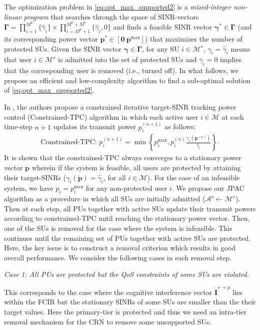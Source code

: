 \documentclass[journal,twoside]{IEEEtran}
\newcommand{\A}{\mathcal{A}}
\newcommand{\M}{\mathcal{M}}
\newcommand{\pbold}{\mathbf{p}}
\newcommand{\pboldzero}{\mathring{\mathbf{p}}}
\newcommand{\pzero}{\mathring{p}}
\newcommand{\gammai}{\gamma_i}
\newcommand{\gammaihat}{\mathit{\widehat{\gamma}}_i}
\newcommand{\gammahat}{\mathit{\widehat{\gamma}}}
\newcommand{\gammabold}{\boldsymbol{\gamma}}
\newcommand{\Gammabold}{\boldsymbol{\Gamma}}
\newcommand{\pmax}{p^{\mathrm{max}}}
\newcommand{\CIzerobold}{{\mathring{\mathbf{I}}^{s \rightarrow p}}}
\begin{document}
	The optimization problem in \eqref{eq:opt_max_supported2} is a \emph{mixed-integer non-linear program} that searches through the space of SINR-vectors $\Gammabold=\prod_{i=1}^{M^p}{\{\gammahat_i\}} \times \prod_{i=M^p+1}^{M^p+M^s} \{\gammahat_i,0\}$ and finds a feasible SINR vector $\gammabold^{*}\in\Gammabold$ (and its corresponding power vector $\pbold^{*}\in [\mathbf{0}\ \mathbf{\pmax}]$) that maximizes the number of protected SUs. 
	Given the SINR vector $\gammabold\in\Gammabold$, for any SU $i\in\M^s$, $\gammai=\gammahat_i$ means that user $i\in\M^s$ is admitted into the set of protected SUs and $\gamma_i=0$ implies that the corresponding user is removed (i.e., turned off). In what follows, we propose an efficient and low-complexity algorithm to find a sub-optimal solution of \eqref{eq:opt_max_supported2}.
	
	In \cite{constrained_TPC}, the authors propose a constrained iterative target-SINR tracking power control (Constrained-TPC) algorithm in which each active user $i\in\M$ at each time-step $n+1$ updates its transmit power $p_i^{(n+1)}$ as follows:
	\begin{align}
	\label{eq:constrained_TPC}
		\textrm{Constrained-TPC:\ } p_i^{(n+1)} \!\! = \! \min \!\left\{\pmax_i,p_i^{(n)}  \frac{\gamma_i(\pbold^{(n)})}{\gammaihat} \! \right\}\!.
	\end{align}
	It is shown that the constrained-TPC always converges to a stationary power vector $\pboldzero$ wherein if the system is feasible, all users are protected by attaining their target-SINRs ($\gamma_i(\pboldzero)=\gammahat_i$, for all $i\in\M$). For the case of an infeasible system, we have $\pzero_i= p_i^\mathrm{max}$ for any non-protected user $i$. We propose our JPAC algorithm as a procedure in which all SUs are initially admitted ($\A^s\leftarrow \M^s$). Then at each step, all PUs together with active SUs update their transmit powers according to constrained-TPC  until reaching the stationary power vector. Then, one of the SUs is removed for the case where the system is infeasible. This continues until the remaining set of PUs together with active SUs are protected. Here, the key issue is to construct a	removal criterion which results in good overall performance. We	consider the following cases in each removal step.
	
	\textit{Case 1: All PUs are protected but the QoS constraints of some SUs are violated.}


	This corresponds to the case where the cognitive interference vector $\CIzerobold$ lies within the FCIR but the stationary SINRs of some SUs are smaller than the their target values. Here the primary-tier is protected and thus we need an intra-tier removal mechanism for the CRN to remove some unsupported SUs.
\end{document}
